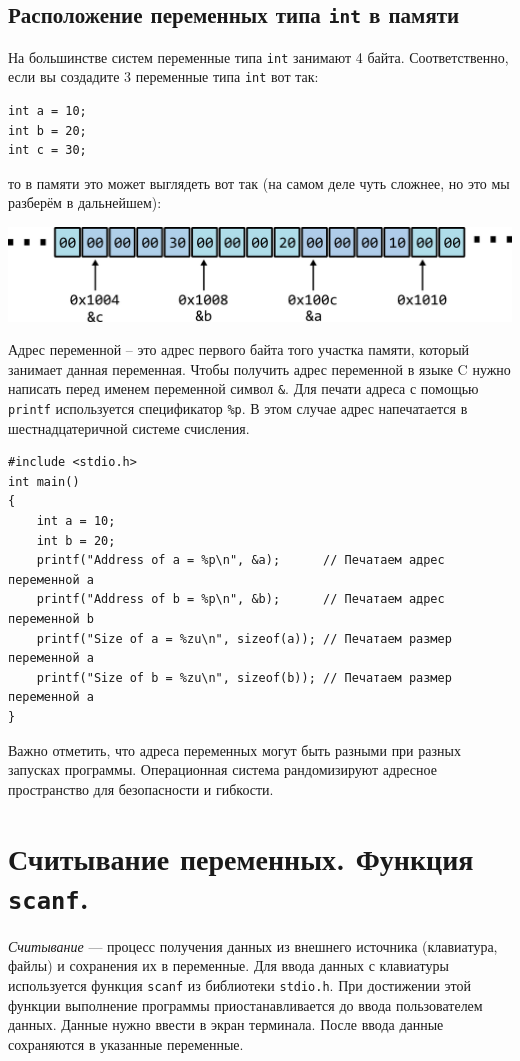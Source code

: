 \documentclass[10pt]{article}
\begin{document}
\subsection*{Расположение переменных типа \texttt{int} в памяти}
На большинстве систем переменные типа \texttt{int} занимают 4 байта. Соответственно, если вы создадите 3 переменные типа \texttt{int} вот так:
\begin{lstlisting}
int a = 10;
int b = 20;
int c = 30;
\end{lstlisting}
то в памяти это может выглядеть вот так (на самом деле чуть сложнее, но это мы разберём в дальнейшем):
\begin{center}
\includegraphics[scale=1]{../images/memory2.png}
\end{center}
Адрес переменной -- это адрес первого байта того участка памяти, который занимает данная переменная.
Чтобы получить адрес переменной в языке C нужно написать перед именем переменной символ \texttt{\&}.
Для печати адреса с помощью \texttt{printf} используется спецификатор \texttt{\%p}. 
В этом случае адрес напечатается в шестнадцатеричной системе счисления.
\begin{lstlisting}
#include <stdio.h>
int main()
{
    int a = 10;
    int b = 20;
    printf("Address of a = %p\n", &a);    	// Печатаем адрес переменной a
    printf("Address of b = %p\n", &b);    	// Печатаем адрес переменной b
    printf("Size of a = %zu\n", sizeof(a));	// Печатаем размер переменной a
    printf("Size of b = %zu\n", sizeof(b));	// Печатаем размер переменной a
}
\end{lstlisting}
Важно отметить, что адреса переменных могут быть разными при разных запусках программы. Операционная система рандомизируют адресное пространство для безопасности и гибкости.


\section*{Считывание переменных. Функция \texttt{scanf}.}
\textit{Считывание} — процесс получения данных из внешнего источника (клавиатура, файлы) и сохранения их в переменные.
Для ввода данных с клавиатуры используется функция \texttt{scanf} из библиотеки \texttt{stdio.h}. При достижении этой функции выполнение программы приостанавливается до ввода пользователем данных. Данные нужно ввести в экран терминала. После ввода данные сохраняются в указанные переменные.
\end{document}
